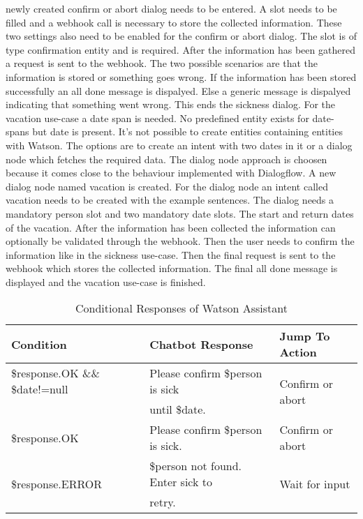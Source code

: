 newly created confirm or abort dialog needs to be entered.
A slot needs to be filled and a webhook call is necessary to store the 
collected information.
These two settings also need to be enabled for the confirm or abort dialog.
The slot is of type confirmation entity and is required.
After the information has been gathered a request is sent to the webhook.
The two possible scenarios are that the information is stored or 
something goes wrong.
If the information has been stored successfully an all done message is dispalyed.
Else a generic message is dispalyed indicating that something went wrong.
This ends the sickness dialog.
For the vacation use-case a date span is needed.
No predefined entity exists for date-spans but date is present.
It's not possible to create entities containing entities with Watson.
The options are to create an intent with two dates in it or a dialog node 
which fetches the required data.
The dialog node approach is choosen because it comes close to the 
behaviour implemented with Dialogflow.
A new dialog node named vacation is created.
For the dialog node an intent called vacation needs to be created with 
the example sentences.
The dialog needs a mandatory person slot and two mandatory date slots.
The start and return dates of the vacation.
After the information has been collected the information can optionally 
be validated through the webhook.
Then the user needs to confirm the information like in the sickness use-case.
Then the final request is sent to the webhook which stores the 
collected information.
The final all done message is displayed and the vacation use-case is finished.

\begin{table}[H]
    \centering
    \begin{tabular}{ l | l | l  }
  Condition & Chatbot Response & Jump To Action \\ \hline \hline
  \$response.OK \&\& \$date!=null & Please confirm \$person is sick & \multirow{2}{*}{Confirm or abort} \\
        & until \$date. & \\ \hline
  \$response.OK & Please confirm \$person is sick. & Confirm or abort \\ \hline
  \multirow{2}{*}{\$response.ERROR} & \$person not found. Enter sick to & \multirow{2}{*}{Wait for input} \\ 
  &  retry. & \\ \hline

\end{tabular}
    \caption{Conditional Responses of Watson Assistant} \label{tab:watson_cond_response}
\end{table} \noindent


